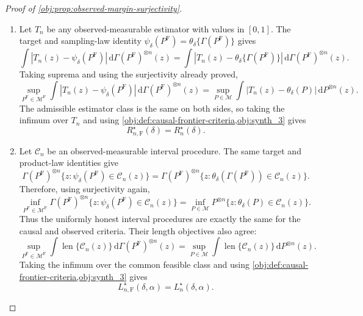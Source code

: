 \documentclass[11pt]{article}
\begin{document}
\begin{proof}[Proof of \cref{obj:prop:observed-margin-surjectivity}]
\begin{enumerate}
\item Let \(T_n\) be any observed-measurable estimator with values in \([0,1]\).  The target and sampling-law identity \(\psi_\delta(P^{\mathrm F})=\theta_\delta\{\Gamma(P^{\mathrm F})\}\) gives
\[
\int
\left|T_n(z)-\psi_\delta(P^{\mathrm F})\right|\,\mathrm d\Gamma(P^{\mathrm F})^{\otimes n}(z)
=
\int
\left|T_n(z)-\theta_\delta\{\Gamma(P^{\mathrm F})\}\right|\,\mathrm d\Gamma(P^{\mathrm F})^{\otimes n}(z).
\]
Taking suprema and using the surjectivity already proved,
\[
\sup_{P^{\mathrm F}\in\mathcal M^{\mathrm F}}
\int
\left|T_n(z)-\psi_\delta(P^{\mathrm F})\right|\,\mathrm d\Gamma(P^{\mathrm F})^{\otimes n}(z)
=
\sup_{P\in\mathcal M}
\int
\left|T_n(z)-\theta_\delta(P)\right|\,\mathrm dP^{\otimes n}(z).
\]
The admissible estimator class is the same on both sides, so taking the infimum over \(T_n\) and using \cref{obj:def:causal-frontier-criteria,obj:synth_3} gives
\[
R_{n,\mathrm F}^{\star}(\delta)=R_n^\star(\delta).
\] %

\item Let \(\mathcal C_n\) be an observed-measurable interval procedure.  The same target and product-law identities give
\[
\Gamma(P^{\mathrm F})^{\otimes n}
\{z:\psi_\delta(P^{\mathrm F})\in\mathcal C_n(z)\}
=
\Gamma(P^{\mathrm F})^{\otimes n}
\{z:\theta_\delta(\Gamma(P^{\mathrm F}))\in\mathcal C_n(z)\}.
\]
Therefore, using surjectivity again,
\[
\inf_{P^{\mathrm F}\in\mathcal M^{\mathrm F}}
\Gamma(P^{\mathrm F})^{\otimes n}
\{z:\psi_\delta(P^{\mathrm F})\in\mathcal C_n(z)\}
=
\inf_{P\in\mathcal M}
P^{\otimes n}\{z:\theta_\delta(P)\in\mathcal C_n(z)\}.
\]
Thus the uniformly honest interval procedures are exactly the same for the causal and observed criteria.  Their length objectives also agree:
\[
\sup_{P^{\mathrm F}\in\mathcal M^{\mathrm F}}
\int \operatorname{len}\{\mathcal C_n(z)\}\,\mathrm d\Gamma(P^{\mathrm F})^{\otimes n}(z)
=
\sup_{P\in\mathcal M}
\int \operatorname{len}\{\mathcal C_n(z)\}\,\mathrm dP^{\otimes n}(z).
\]
Taking the infimum over the common feasible class and using \cref{obj:def:causal-frontier-criteria,obj:synth_3} gives
\[
L_{n,\mathrm F}^{\star}(\delta,\alpha)=L_n^\star(\delta,\alpha).
\] %
\end{enumerate}
\end{proof}
\end{document}
